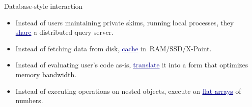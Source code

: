 \documentclass{beamer}
\begin{document}
\begin{frame}{Database-style interaction}
\vspace{0.5 cm}
\begin{itemize}\setlength{\itemsep}{0.25 cm}
\item<2-> Instead of users maintaining private skims, running local processes, they \textcolor{darkblue}{\underline{share}} a distributed query server.
\item<3-> Instead of fetching data from disk, \textcolor{darkblue}{\underline{cache}} \mbox{in RAM/SSD/X-Point.\hspace{-1 cm}}
\item<4-> Instead of evaluating user's code as-is, \textcolor{darkblue}{\underline{translate}} it into a form that optimizes memory bandwidth.
\item<5-> Instead of executing operations on nested objects, execute on \textcolor{darkblue}{\underline{flat arrays}} of numbers.
\end{itemize}
\end{frame}
\end{document}
